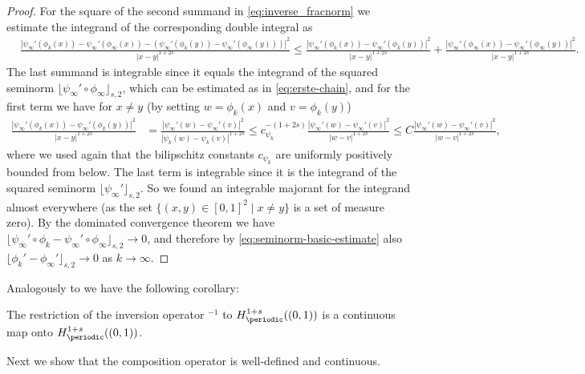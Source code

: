 \begin{proof}
For the square of the
second summand in \cref*{eq:inverse_fracnorm} we estimate 
the integrand of the corresponding double integral as
\begin{align*}
&
\textstyle
\frac{|\psi_\infty'(\phi_k(x))-\psi_\infty'(\phi_\infty(x))-(\psi_\infty'
(\phi_k(y))
-\psi_\infty'(\phi_\infty(y)))|^2}{\left|x-y \right|^{1+2s}}
\textstyle
\le \frac{|\psi_\infty'(\phi_k(x))-\psi_\infty'(\phi_k(y))|^2}{\left|x
-y \right|^{1+2s}}+\frac{|\psi_\infty'(\phi_\infty(x))
-\psi_\infty'(\phi_\infty(y))|^2}{\left|x-y \right|^{1+2s}}.
\end{align*}
The last summand is integrable since it equals the integrand of
the squared seminorm $\lfloor\psi_\infty'\circ\phi_\infty\rfloor_{s,2}$,
which can be estimated as 
 in \cref{eq:erste-chain},
and for the first term we have for $x\not = y$ (by setting $w=\phi_k(x)$ and $v=\phi_k(y)$)
\begin{align*}
\textstyle
\frac{|\psi_\infty'(\phi_k(x))-\psi_\infty'(\phi_k(y))|^2}{\left|x-y \right|^{1+2s}}
&
\textstyle
=\frac{|\psi_\infty'(w)-\psi_\infty'(v)|^2}{\left|\psi_k(w)-\psi_k(v) \right|^{1+2s}}
\le
c_{\psi_k}^{-(1+2s)}\frac{|\psi_\infty'(w)
-\psi_\infty'(v)|^2}{\left|w-v \right|^{1+2s}}
\le C\frac{|\psi_\infty'(w)
-\psi_\infty'(v)|^2}{\left|w-v \right|^{1+2s}},
\end{align*}
where we used again that the bilipschitz constants $c_{\psi_k}$ are 
uniformly positively bounded from below.
The last term is integrable since it is the integrand of
the squared seminorm $\lfloor\psi_\infty'\rfloor_{s,2}$.
So we found an integrable majorant for the integrand almost everywhere 
(as the set $\{(x,y)\in[0,1]^2 \mid x\not=y\}$ is a set of measure zero). 
By the dominated convergence theorem we have 
$\lfloor \psi_\infty'\circ\phi_k-\psi_\infty'\circ\phi_\infty
\rfloor_{s,2}\to 0$, and therefore by \cref{eq:seminorm-basic-estimate}
also $\lfloor\phi_k'-\phi_\infty'\rfloor_{s,2}\to 0$ as $k\to\infty$.
\end{proof}
Analogously to \cite[Corollary 1.17]{reiter_2009} we have the following corollary:
\begin{corollary}\label{cor:restriction-inverse-operator}
The restriction of the inversion operator $^{-1}$ to $H^{1+s}_\periodic((0,1))$ 
is a continuous map onto $H^{1+s}_\periodic((0,1))$.
\end{corollary}
Next we show that the composition operator is well-defined and continuous. 
\begin{lemma}
\label[lemma]{composition_continuous}
Let $s\in (\frac{1}{2},1]$. The composition operator 
\begin{align}\label{eq:composition-operator}
H_p^{1+s}((0,1))\times H^{1+s}(\R/\Z,\R^n)\to H^{1+s}(\R/\Z,\R^n),\quad
(\psi,h)\mapsto h\circ\psi,
\end{align}
is well-defined and continuous. 
\end{lemma}

